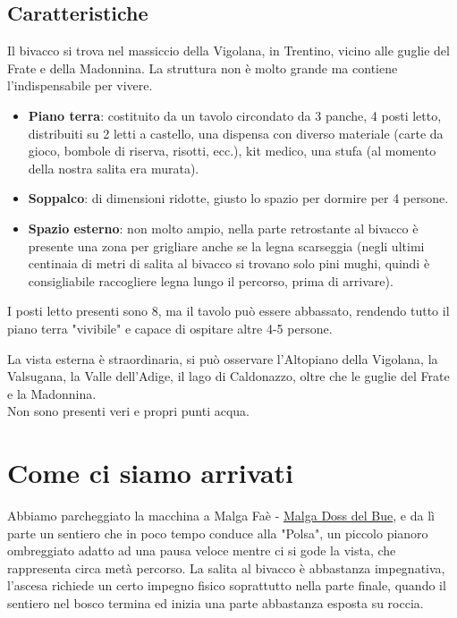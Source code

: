 \documentclass{article}
\begin{document}
\subsection{Caratteristiche}
Il bivacco si trova nel massiccio della Vigolana, in Trentino, vicino alle guglie del Frate e della Madonnina.
La struttura non è molto grande ma contiene l'indispensabile per vivere.
\begin{itemize}
    \item \textbf{Piano terra}: costituito da un tavolo circondato da 3 panche, 4 posti letto, distribuiti su 2 letti a castello, una dispensa con diverso materiale (carte da gioco, bombole di riserva, risotti, ecc.), kit medico, una stufa (al momento della nostra salita era murata).
    \item \textbf{Soppalco}: di dimensioni ridotte, giusto lo spazio per dormire per 4 persone.
    \item \textbf{Spazio esterno}: non molto ampio, nella parte retrostante al bivacco è presente una zona per grigliare anche se la legna scarseggia (negli ultimi centinaia di metri di salita al bivacco si trovano solo pini mughi, quindi è consigliabile raccogliere legna lungo il percorso, prima di arrivare).
\end{itemize}

I posti letto presenti sono 8, ma il tavolo può essere abbassato, rendendo tutto il piano terra "vivibile" e capace di ospitare altre 4-5 persone.

La vista esterna è straordinaria, si può osservare l'Altopiano della Vigolana, la Valsugana, la Valle dell'Adige, il lago di Caldonazzo, oltre che le guglie del Frate e la Madonnina.\\

Non sono presenti veri e propri punti acqua.

\section{Come ci siamo arrivati}
Abbiamo parcheggiato la macchina a Malga Faè - \href{https://maps.google.com/?q=45.9830253914458, 11.205372344457928}{Malga Doss del Bue}, e da lì parte un sentiero che in poco tempo conduce alla "Polsa", un piccolo pianoro ombreggiato adatto ad una pausa veloce mentre ci si gode la vista, che rappresenta circa metà percorso. La salita al bivacco è abbastanza impegnativa, l'ascesa richiede un certo impegno fisico soprattutto nella parte finale, quando il sentiero nel bosco termina ed inizia una parte abbastanza esposta su roccia.
\end{document}
